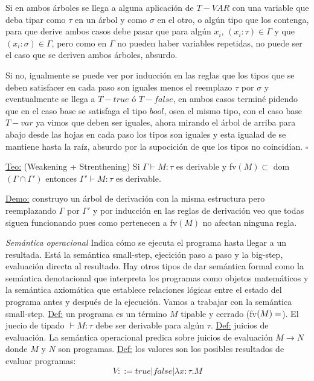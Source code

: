 \documentclass[12pt]{extarticle}
\def\definicion{\newline\underline{Def:} }
\def\demostracion{\underline{Demo:} }
\def\teorema{\underline{Teo:} }
\begin{document}
Si en ambos árboles se llega a alguna aplicación de $T-VAR$ con una variable que deba tipar como $\tau$ en un árbol y como $\sigma$ en el otro, o algún tipo que los contenga, para que derive ambos casos debe pasar que para algún $x_i$, $(x_i : \tau) \in \Gamma$ y que $(x_i : \sigma) \in \Gamma$, pero como en $\Gamma$ no pueden haber variables repetidas, no puede ser el caso que se deriven ambos árboles, absurdo.

Si no, igualmente se puede ver por inducción en las reglas que los tipos que se deben satisfacer en cada paso son iguales menos el reemplazo $\tau$ por $\sigma$ y eventualmente se llega a $T-true$ ó $T-false$, en ambos casos terminé pidendo que en el caso base se satisfaga el tipo $bool$, osea el mismo tipo, con el caso base $T-var$ ya vimos que deben ser iguales, ahora mirando el árbol de arriba para abajo desde las hojas en cada paso los tipos son iguales y esta igualad de se mantiene hasta la raíz, absurdo por la supocición de que los tipos no coincidían. $\square$

\teorema (Weakening + Strenthening)
Si $\Gamma \vdash M : \tau$ es derivable y fv$(M) \subset$ dom$(\Gamma \cap \Gamma')$ entonces $\Gamma' \vdash M : \tau$ es derivable.

\demostracion construyo un árbol de derivación con la misma estructura pero reemplazando $\Gamma$ por $\Gamma'$ y por inducción en las reglas de derivación veo que todas siguen funcionando pues como pertenecen a fv$(M)$ no afectan ninguna regla.


%

\textit{Semántica operacional}
Indica cómo se ejecuta el programa hasta llegar a un resultada. Está la semántica small-step, ejecición paso a paso y la big-step, evaluación directa al resultado. Hay otros tipos de dar semántica formal como la semántica denotacional que interpreta los programas como objetos matemáticos y la semántica axiomática que establece relaciones lógicas entre el estado del programa antes y después de la ejecución. Vamos a trabajar con la semántica small-step.
\definicion un programa es un término $M$ tipable y cerrado (fv$(M) = \empty$). El juecio de tipado $\vdash M : \tau$ debe ser derivable para algún $\tau$.
\definicion juicios de evaluación. La semántica operacional predica sobre juicios de evaluación $M \rightarrow N$ donde $M$ y $N$ son programas.
\definicion los valores son los posibles resultados de evaluar programas:
$$ V::= true | false | \lambda x: \tau. M $$
\end{document}
